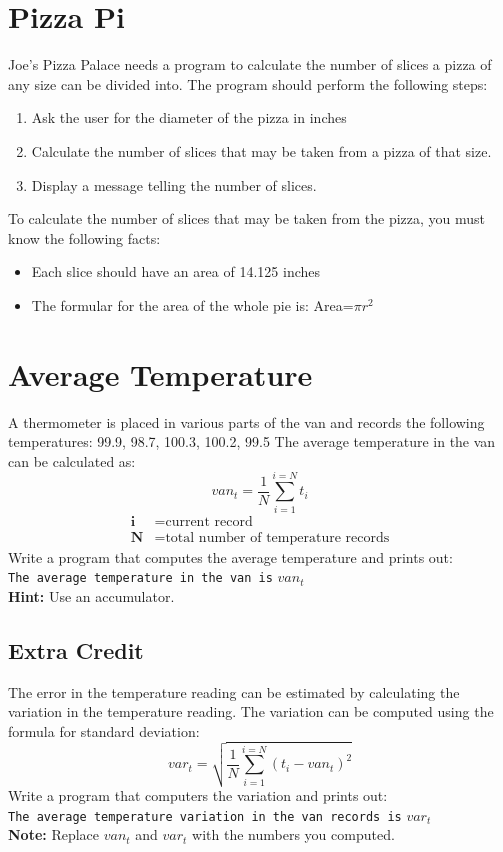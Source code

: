 \documentclass{article}
\begin{document}
\section{Pizza Pi}
Joe's Pizza Palace needs a program to calculate the number of slices a pizza of any size can be divided into. The program should perform the following steps:
\begin{enumerate}
	\item Ask the user for the diameter of the pizza in inches
	\item Calculate the number of slices that may be taken from a pizza of that size. 
	\item Display a message telling the number of slices.
\end{enumerate}

To calculate the number of slices that may be taken from the pizza, you must know the following facts:
\begin{itemize}
	\item Each slice should have an area of 14.125 inches
	\item The formular for the area of the whole pie is: Area=$\pi r^2$ 
\end{itemize}

\section{Average Temperature}
A thermometer is placed in various parts of the van and records the following temperatures: 99.9, 98.7, 100.3, 100.2, 99.5 
The average temperature in the van can be calculated as:
\begin{equation}
	van_{t} = \frac{1}{N}\sum_{i=1}^{i=N}t_{i}
\end{equation}
\begin{align*}
	\textbf{i} &= \text{current record}\\
	\textbf{N} &=  \text{total number of temperature records}
\end{align*}
Write a program that computes the average temperature and prints out: \\
\texttt{The average temperature in the van is} \textit{$van_{t}$}\\
\textbf{Hint:} Use an accumulator. 


\subsection{Extra Credit}
The error in the temperature reading can be estimated by calculating the variation in the temperature reading. The variation can be computed using the formula for standard deviation:
\begin{equation}
	var_{t} = \sqrt{\frac{1}{N}\sum_{i=1}^{i=N}(t_{i} - van_{t})^{2}}
\end{equation}
Write a program that computers the variation and prints out:\\
\texttt{The average temperature variation in the van records is} \textit{$var_{t}$}\\
\textbf{Note:} Replace $van_{t}$ and $var_{t}$ with the numbers you computed. 
\end{document}
